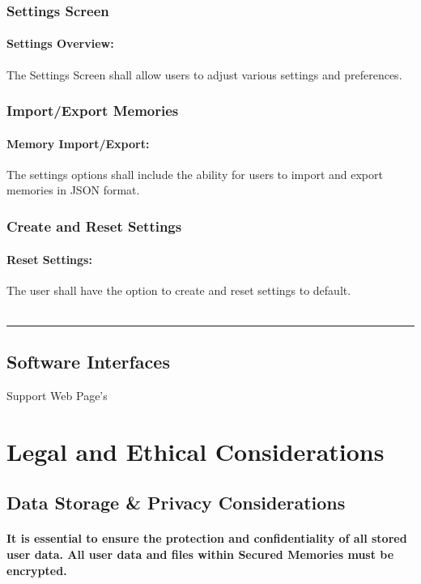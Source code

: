\documentclass{article}
\begin{document}
\subsubsection*{Settings Screen}
\addtocounter{subsubsection}{1}
\paragraph{Settings Overview:} The Settings Screen shall allow users to adjust various settings and preferences.
\subsubsection*{Import/Export Memories}
\addtocounter{subsubsection}{1}
\paragraph{Memory Import/Export:} The settings options shall include the ability for users to import and export memories in JSON format.
\subsubsection*{Create and Reset Settings}
\addtocounter{subsubsection}{1}
\paragraph{Reset Settings:} The user shall have the option to create and reset settings to default. \\ \\
\hrule
\newpage
\subsection{Software Interfaces}
Support Web Page’s \\
\section{Legal and Ethical Considerations}
\subsection{Data Storage \& Privacy Considerations}
\paragraph{It is essential to ensure the protection and confidentiality of all stored user data. All user data and files within Secured Memories must be encrypted.}
\end{document}
